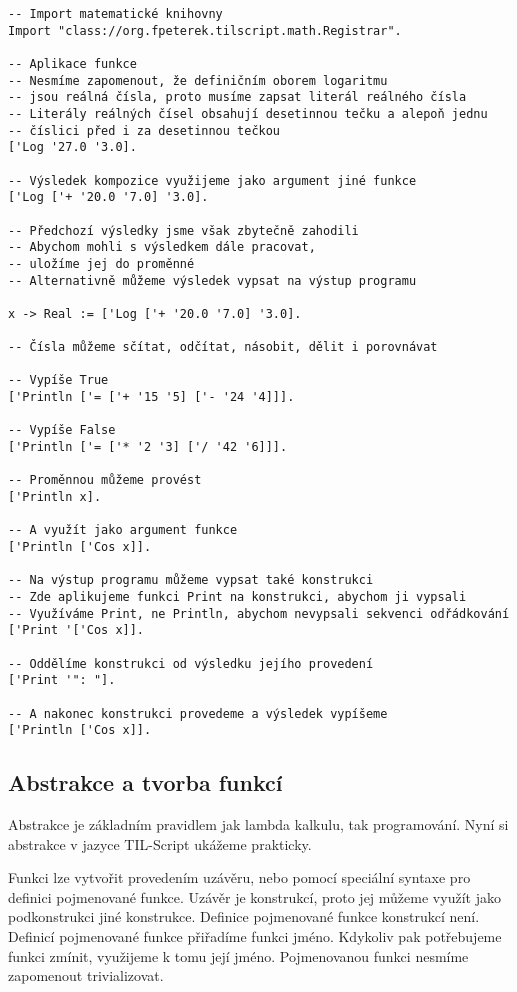 \begin{lstlisting}[caption={Aritmetika v jazyce TIL-Script}]
-- Import matematické knihovny
Import "class://org.fpeterek.tilscript.math.Registrar".

-- Aplikace funkce
-- Nesmíme zapomenout, že definičním oborem logaritmu
-- jsou reálná čísla, proto musíme zapsat literál reálného čísla
-- Literály reálných čísel obsahují desetinnou tečku a alepoň jednu
-- číslici před i za desetinnou tečkou
['Log '27.0 '3.0].

-- Výsledek kompozice využijeme jako argument jiné funkce
['Log ['+ '20.0 '7.0] '3.0].

-- Předchozí výsledky jsme však zbytečně zahodili
-- Abychom mohli s výsledkem dále pracovat,
-- uložíme jej do proměnné
-- Alternativně můžeme výsledek vypsat na výstup programu

x -> Real := ['Log ['+ '20.0 '7.0] '3.0].

-- Čísla můžeme sčítat, odčítat, násobit, dělit i porovnávat

-- Vypíše True
['Println ['= ['+ '15 '5] ['- '24 '4]]].

-- Vypíše False
['Println ['= ['* '2 '3] ['/ '42 '6]]].

-- Proměnnou můžeme provést
['Println x].

-- A využít jako argument funkce
['Println ['Cos x]].

-- Na výstup programu můžeme vypsat také konstrukci
-- Zde aplikujeme funkci Print na konstrukci, abychom ji vypsali
-- Využíváme Print, ne Println, abychom nevypsali sekvenci odřádkování
['Print '['Cos x]].

-- Oddělíme konstrukci od výsledku jejího provedení
['Print '": "].

-- A nakonec konstrukci provedeme a výsledek vypíšeme
['Println ['Cos x]].
\end{lstlisting}

\subsection{Abstrakce a tvorba funkcí}

Abstrakce je základním pravidlem jak lambda kalkulu, tak programování. Nyní si abstrakce v jazyce
TIL-Script ukážeme prakticky.

Funkci lze vytvořit provedením uzávěru, nebo pomocí speciální syntaxe pro definici pojmenované
funkce. Uzávěr je konstrukcí, proto jej můžeme využít jako podkonstrukci jiné konstrukce. Definice
pojmenované funkce konstrukcí není. Definicí pojmenované funkce přiřadíme funkci jméno. Kdykoliv
pak potřebujeme funkci zmínit, využijeme k tomu její jméno. Pojmenovanou funkci nesmíme zapomenout
trivializovat.

